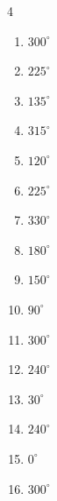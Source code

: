 \begin{multicols}{4}
\begin{enumerate}
  \item $\displaystyle 300^{\circ}$

  \item $\displaystyle 225^{\circ}$

  \item $\displaystyle 135^{\circ}$

  \item $\displaystyle 315^{\circ}$

  \item $\displaystyle 120^{\circ}$

  \item $\displaystyle 225^{\circ}$

  \item $\displaystyle 330^{\circ}$

  \item $\displaystyle 180^{\circ}$
        \phantom{$\displaystyle =\pi$}

  \item $\displaystyle 150^{\circ}$

  \item $\displaystyle 90^{\circ}$

  \item $\displaystyle 300^{\circ}$

\columnbreak %

  \item $\displaystyle 240^{\circ}$

  \item $\displaystyle 30^{\circ}$

  \item $\displaystyle 240^{\circ}$

  \item $\displaystyle 0^{\circ}$
        \phantom{$\displaystyle =0$}

  \item $\displaystyle 300^{\circ}$


\end{enumerate}
\end{multicols}
